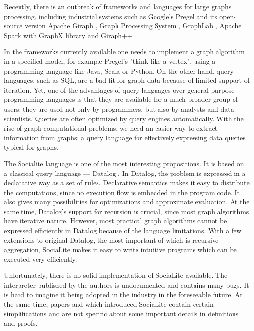Recently, there is an outbreak of frameworks and languages for large graphs processing, including industrial systems such as Google's Pregel \cite{pregel} and its open-source version Apache Giraph \cite{giraph}, Graph Processing System \cite{gps}, GraphLab \cite{graphlabwww, graphlab, graphlab2}, Apache Spark with GraphX library \cite{spark2, sparkwww} and Giraph++ \cite{giraphpp}.

In the frameworks currently available one needs to implement a graph algorithm in a specified model, for example Pregel's "think like a vertex", using a programming language like Java, Scala or Python. On the other hand, query languages, such as SQL, are a bad fit for graph data because of limited support of iteration. Yet, one of the advantages of query languages over general-purpose programming languages is that they are available for a much broader group of users: they are used not only by programmers, but also by analysts and data scientists. Queries are often optimized by query engines automatically. With the rise of graph computational problems, we need an easier way to extract information from graphs: a query language for effectively expressing data queries typical for graphs.

The Socialite \cite{socialite, distsoc} language is one of the most interesting propositions. It is based on a classical query language --- Datalog \cite{fod}. In Datalog, the problem is expressed in a declarative way as a set of rules. Declarative semantics makes it easy to distribute the computations, since no execution flow is embedded in the program code. It also gives many possibilities for optimizations and approximate evaluation. At the same time, Datalog's support for recursion is crucial, since most graph algorithms have iterative nature. However, most practical graph algorithms cannot be expressed efficiently in Datalog because of the language limitations. With a few extensions to original Datalog, the most important of which is recursive aggregation, SociaLite makes it easy to write intuitive programs which can be executed very efficiently.

Unfortunately, there is no solid implementation of SociaLite available. The interpreter published by the authors is undocumented and contains many bugs. It is hard to imagine it being adopted in the industry in the foreseeable future. At the same time, papers \cite{socialite} and \cite{distsoc} which introduced SociaLite contain certain simplifications and are not specific about some important details in definitions and proofs.

